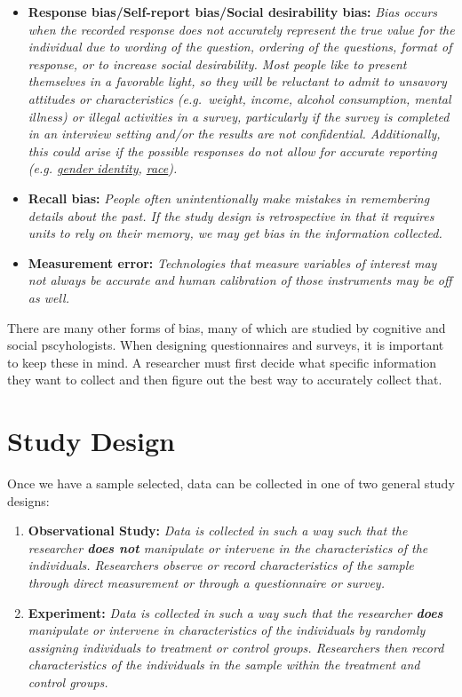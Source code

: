 \documentclass[]{book}
\providecommand{\tightlist}{%
  \setlength{\itemsep}{0pt}\setlength{\parskip}{0pt}}
\begin{document}
\begin{itemize}
\tightlist
\item
  \textbf{Response bias/Self-report bias/Social desirability bias:} \emph{Bias occurs when the recorded response does not accurately represent the true value for the individual due to wording of the question, ordering of the questions, format of response, or to increase social desirability. Most people like to present themselves in a favorable light, so they will be reluctant to admit to unsavory attitudes or characteristics (e.g.~weight, income, alcohol consumption, mental illness) or illegal activities in a survey, particularly if the survey is completed in an interview setting and/or the results are not confidential. Additionally, this could arise if the possible responses do not allow for accurate reporting (e.g. \href{https://www.hrc.org/resources/collecting-transgender-inclusive-gender-data-in-workplace-and-other-surveys}{gender identity}, \href{https://www.pewsocialtrends.org/interactives/multiracial-timeline/}{race}).}
\item
  \textbf{Recall bias:} \emph{People often unintentionally make mistakes in remembering details about the past. If the study design is retrospective in that it requires units to rely on their memory, we may get bias in the information collected.}
\item
  \textbf{Measurement error:} \emph{Technologies that measure variables of interest may not always be accurate and human calibration of those instruments may be off as well.}
\end{itemize}

There are many other forms of bias, many of which are studied by cognitive and social pscyhologists. When designing questionnaires and surveys, it is important to keep these in mind. A researcher must first decide what specific information they want to collect and then figure out the best way to accurately collect that.

\hypertarget{study-design}{%
\section{Study Design}\label{study-design}}

Once we have a sample selected, data can be collected in one of two general study designs:

\begin{enumerate}
\def\labelenumi{\arabic{enumi}.}
\item
  \textbf{Observational Study:} \emph{Data is collected in such a way such that the researcher \textbf{does not} manipulate or intervene in the characteristics of the individuals. Researchers observe or record characteristics of the sample through direct measurement or through a questionnaire or survey.}
\item
  \textbf{Experiment:} \emph{Data is collected in such a way such that the researcher \textbf{does} manipulate or intervene in characteristics of the individuals by randomly assigning individuals to treatment or control groups. Researchers then record characteristics of the individuals in the sample within the treatment and control groups.}
\end{enumerate}
\end{document}

